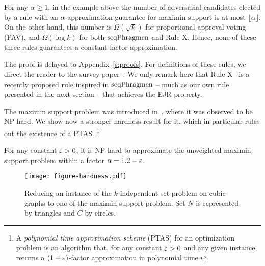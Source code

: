 \begin{lemma}\label{lem:badexamples}
For any $\alpha \geq 1$, in the example above the number of adversarial candidates elected by a rule with an $\alpha$-approximation guarantee for maximin support is at most $\lfloor \alpha \rfloor$. 
On the other hand, this number is $\Omega(\sqrt{k})$ for proportional approval voting (PAV), and $\Omega(\log k)$ for both $\operatorname{seqPhragmen}$ and Rule X. 
Hence, none of these three rules guarantees a constant-factor approximation. 
\end{lemma}

The proof is delayed to Appendix~\ref{s:proofs}. 
For definitions of these rules, we direct the reader to the survey paper~\cite{lackner2020approval}.
We only remark here that Rule X~\cite{peters2019proportionality} is a recently proposed rule inspired in $\operatorname{seqPhragmen}$ -- much as our own rule presented in the next section -- that achieves the EJR property. 

The maximin support problem was introduced in~\cite{sanchez2016maximin}, where it was observed to be NP-hard. We show now a stronger hardness result for it, which in particular rules out the existence of a PTAS.%
\footnote{A \emph{polynomial time approximation scheme} (PTAS) for an optimization problem is an algorithm that, for any constant $\varepsilon>0$ and any given instance, returns a $(1+\varepsilon)$-factor approximation in polynomial time.} 


\begin{theorem}
For any constant $\varepsilon>0$, it is NP-hard to approximate the unweighted maximin support problem within a factor $\alpha=1.2-\varepsilon$.
\end{theorem}

\begin{figure}[tb]
  \centering
	\texttt{[image: figure-hardness.pdf]}
  \caption{Reducing an instance of the $k$-independent set problem on cubic graphs to one of the maximin support problem. Set $N$ is represented by triangles and $C$ by circles.}
  \label{fig:hardness}
\end{figure}

